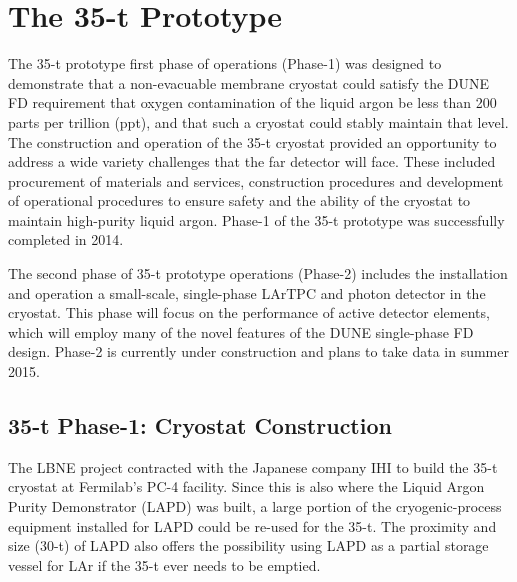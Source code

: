 \section{The 35-t Prototype} 
\label{sec:proto-35t}

The 35-t prototype first phase of operations (Phase-1) was designed
to demonstrate that a non-evacuable membrane cryostat could satisfy
the DUNE FD requirement that oxygen contamination of the liquid argon
be less than 200 parts per trillion (ppt), and that such a cryostat
could stably maintain that level.  The construction and operation of
the 35-t cryostat provided an opportunity to address a wide variety
challenges that the far detector will face.  These included
procurement of materials and services, construction procedures and
development of operational procedures to ensure safety and the ability
of the cryostat to maintain high-purity liquid argon.  Phase-1 of the
35-t prototype was successfully completed in 2014.

The second phase of 35-t prototype operations (Phase-2) includes the
installation and operation a small-scale, single-phase LArTPC and
photon detector in the cryostat.  This phase will focus on the
performance of active detector elements, which will employ many of the
novel features of the DUNE single-phase FD design.  Phase-2 is
currently under construction and plans to take data in summer
2015.

\subsection{35-t Phase-1: Cryostat Construction}

The LBNE project contracted with the Japanese company IHI
to build the 35-t cryostat at Fermilab's PC-4 facility.
Since this is also where the Liquid Argon Purity Demonstrator (LAPD)\cite{bib:lapdP07005}
was built, a large portion of the cryogenic-process 
equipment installed for LAPD could be re-used for the 35-t.
The proximity and size (30-t) of LAPD also offers the possibility using LAPD as 
a partial storage vessel for LAr if the 35-t ever needs to be emptied.

